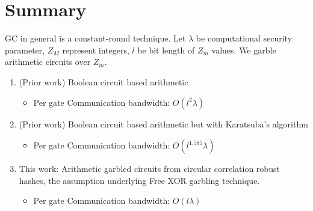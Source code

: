 
\clearpage
{}

%
\setcounter{section}{0} %

\section{Summary}
GC in general is a constant-round technique. Let $\lambda$ be computational security parameter, $Z_M$ represent integers, $l$ be bit length of $Z_m$ values. We garble arithmetic circuits over $Z_m$.
\begin{enumerate}
   \item (Prior work) Boolean circuit based arithmetic
    \begin{itemize}
        \item Per gate Communication bandwidth: $O(l^2 \lambda)$
    \end{itemize}
   \item (Prior work) Boolean circuit based arithmetic but with Karatsuba's algorithm
    \begin{itemize}
        \item Per gate Communication bandwidth: $O(l^{1.585} \lambda)$
    \end{itemize}
   \item This work: Arithmetic garbled circuits from circular correlation robust hashes, the assumption underlying Free XOR garbling technique.
    \begin{itemize}
        \item Per gate Communication bandwidth: $O(l \lambda)$
    \end{itemize}
\end{enumerate}




%
